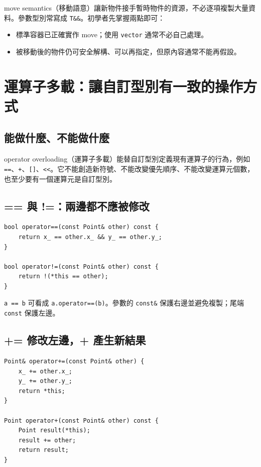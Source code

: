 \documentclass[11pt,a4paper]{article}
\newcommand{\code}[1]{\texttt{#1}}
\begin{document}
move semantics（移動語意）讓新物件接手暫時物件的資源，不必逐項複製大量資料。參數型別常寫成 \code{T\&\&}。初學者先掌握兩點即可：
\begin{itemize}
  \item 標準容器已正確實作 move；使用 \code{vector} 通常不必自己處理。
  \item 被移動後的物件仍可安全解構、可以再指定，但原內容通常不能再假設。
\end{itemize}

\section{運算子多載：讓自訂型別有一致的操作方式}

\subsection{能做什麼、不能做什麼}

operator overloading（運算子多載）能替自訂型別定義現有運算子的行為，例如 \code{==}、\code{+}、\code{[]}、\code{<<}。它不能創造新符號、不能改變優先順序、不能改變運算元個數，也至少要有一個運算元是自訂型別。

\subsection{== 與 !=：兩邊都不應被修改}

\begin{lstlisting}
bool operator==(const Point& other) const {
    return x_ == other.x_ && y_ == other.y_;
}

bool operator!=(const Point& other) const {
    return !(*this == other);
}
\end{lstlisting}

\code{a == b} 可看成 \code{a.operator==(b)}。參數的 \code{const\&} 保護右邊並避免複製；尾端 \code{const} 保護左邊。

\subsection{+= 修改左邊，+ 產生新結果}

\begin{lstlisting}
Point& operator+=(const Point& other) {
    x_ += other.x_;
    y_ += other.y_;
    return *this;
}

Point operator+(const Point& other) const {
    Point result(*this);
    result += other;
    return result;
}
\end{lstlisting}
\end{document}
